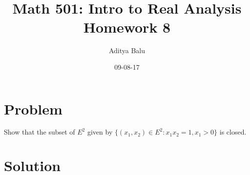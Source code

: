 \documentclass[]{article}
\title{Math 501: Intro to Real Analysis\\Homework 8}
\date{09-08-17}
\author{Aditya Balu}
\begin{document}
\maketitle

\section*{Problem}
Show that the subset of $E^2$ given by $\{(x_1,x_2) \in E^2 : x_1x_2 =1 , x_1 >0 \}$ is closed.

\section*{Solution}
\end{document}
